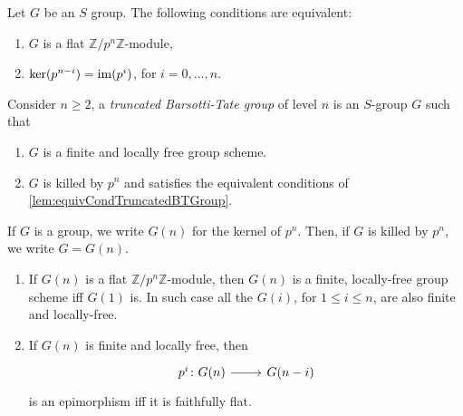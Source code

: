 \documentclass[../Main]{subfiles}
\begin{document}
\begin{lem}\label{lem:equivCondTruncatedBTGroup}
	Let $G$ be an $S$ group.
	The following conditions are equivalent:
\begin{enumerate}
	\item $G$ is a flat $\mathbb{Z}/p^n\mathbb{Z}$-module,

	\item $\ker(p^{n-i}) = \operatorname{im} (p^i)$, for $i=0, \ldots, n$.
\end{enumerate}
\end{lem} 


\begin{defn}
	Consider $n \geq 2$, a {\em truncated Barsotti-Tate group} of level $n$
	is an $S$-group $G$ such that
\begin{enumerate}
	\item $G$ is a finite and locally free group scheme.
	\item $G$ is killed by $p^n$ and satisfies the equivalent conditions of 
		\cref{lem:equivCondTruncatedBTGroup}.
\end{enumerate}
\end{defn}


\begin{defn}[]
	If $G$ is a group, we write $G(n)$ for the kernel of $p^n$.
	Then, if $G$ is killed by $p^n$, we write $G = G(n)$.
\end{defn}


\begin{lem}\leavevmode\vspace{-.2\baselineskip}
\begin{enumerate}
	\item If $G(n)$ is a flat $\mathbb{Z}/p^n\mathbb{Z}$-module, then $G(n)$
		is a finite, locally-free group scheme iff
		$G(1)$ is. 
		In such case all the $G(i)$, for $1 \leq i \leq n$, are also finite and locally-free.

	\item If $G(n)$ is finite and locally free, then
		\begin{equation}
		\begin{tikzcd}[row sep = 0ex
			,/tikz/column 1/.append style={anchor=base east}
			,/tikz/column 2/.append style={anchor=base west}]
			p^i\colon G(n) \arrow[r, "", rightarrow] &
			G(n-i)
		\end{tikzcd}
		\end{equation} 
		is an epimorphism iff it is faithfully flat.
\end{enumerate}
\end{lem} 
\end{document}
